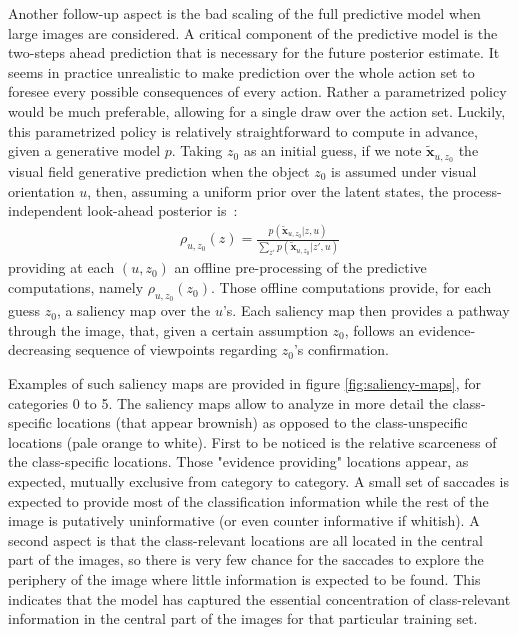 \documentclass{article} %
\begin{document}
Another follow-up aspect is the bad scaling of the full predictive model when large images are considered. A critical component of the predictive model is the two-steps ahead prediction that is necessary for the future posterior estimate. It seems in practice unrealistic to make prediction over the whole action set to foresee every possible consequences of every action. Rather a parametrized policy would be much preferable, allowing for a single draw over the action set.
Luckily, this parametrized policy is relatively straightforward to compute in advance, given a generative model $p$. Taking $z_0$ as an initial guess, if we note $\tilde{\boldsymbol{x}}_{u,z_0}$ the visual field generative prediction when the object $z_0$ is assumed under visual orientation $u$, then, assuming a uniform prior over the latent states, the process-independent look-ahead posterior is~:
\begin{align}
\rho_{u, z_0} (z)=  \frac{p(\tilde{\boldsymbol{x}}_{u, z_0}|z,u)}{\sum_{z'} p(\tilde{\boldsymbol{x}}_{u, z_0}|z',u)}
\end{align}
providing at each $(u, z_0)$ an offline pre-processing of the predictive computations, namely $\rho_{u, z_0}(z_0)$. Those offline computations provide, for each guess $z_0$, a saliency map over the $u$'s. {\color{blue} Each saliency map then provides a pathway through the image, that, given a certain assumption $z_0$, follows an evidence-decreasing sequence of viewpoints regarding $z_0$'s confirmation.}  

Examples of such saliency maps are provided in figure \ref{fig:saliency-maps}, for categories 0 to 5. The saliency maps allow to analyze in more detail the class-specific locations (that appear brownish) as opposed to the class-unspecific locations (pale orange to white). First to be noticed is the relative scarceness of the class-specific locations. Those "evidence providing" locations appear, as expected, mutually exclusive from category to category. A small set of saccades is expected to provide most of the classification information while the rest of the image is putatively uninformative (or even counter informative if whitish). A second aspect is that the class-relevant locations are all located in the central part of the images, so there is very few chance for the saccades to explore the periphery of the image where little information is expected to be found. This indicates that the model has captured the essential concentration of class-relevant information in the central part of the images for that particular training set.
\end{document}
